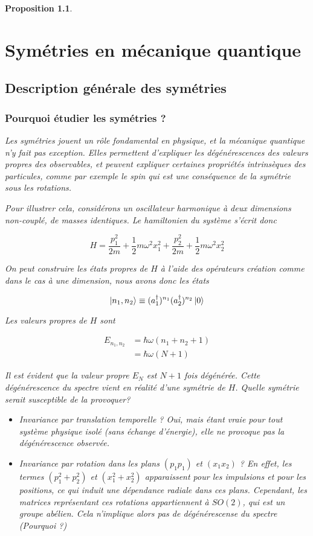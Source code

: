 \documentclass[11pt,twoside,a4paper]{report}
\numberwithin{equation}{part}
\newtheorem{property}[theorem]{Proposition}
\begin{document}
\begin{property}
\part{Symétries en mécanique quantique}

\chapter{Description générale des symétries}

\section{Pourquoi étudier les symétries ?}

Les symétries jouent un rôle fondamental en physique, et la mécanique quantique n'y fait pas exception. Elles permettent d'expliquer les dégénérescences des valeurs propres des observables, et peuvent expliquer certaines propriétés intrinsèques des particules, comme par exemple le spin qui est une conséquence de la symétrie sous les rotations.

Pour illustrer cela, considérons un oscillateur harmonique à deux dimensions non-couplé, de masses identiques. Le hamiltonien du système s'écrit donc

\begin{equation}
  H = \frac{p_1^2}{2m} + \frac{1}{2}m\omega^2x_1^2 + \frac{p_2^2}{2m} + \frac{1}{2}m\omega^2x_2^2
\end{equation}

On peut construire les états propres de $H$ à l'aide des opérateurs création comme dans le cas à une dimension, nous avons donc les états 

\begin{equation}
  \ket{n_1, n_2} \equiv (a_1^\dagger)^{n_1} (a_2^\dagger)^{n_2} \ket{0}
\end{equation}

Les valeurs propres de $H$ sont

\begin{align}
  E_{n_1, n_2} &= \hbar\omega(n_1 + n_2 + 1) \\
  &= \hbar\omega (N+1)
\end{align}

Il est évident que la valeur propre $E_N$ est $N+1$ fois dégénérée. Cette dégénérescence du spectre vient en réalité d'une symétrie de $H$. Quelle symétrie serait susceptible de la provoquer?

\begin{itemize}
    \item Invariance par translation temporelle ? Oui, mais étant vraie pour tout système physique isolé (sans échange d'énergie), elle ne provoque pas la dégénérescence observée.
    \item Invariance par rotation dans les plans $(p_1p_1)$ et $(x_1x_2)$ ? En effet, les termes $(p_1^2 + p_2^2)$ et $(x_1^2 + x_2^2)$ apparaissent pour les impulsions et pour les positions, ce qui induit une dépendance radiale dans ces plans. Cependant, les matrices représentant ces rotations appartiennent à $SO(2)$, qui est un groupe abélien. Cela n'implique alors pas de dégénérescense du spectre (Pourquoi ?)
\end{itemize}


\end{property}
\end{document}
